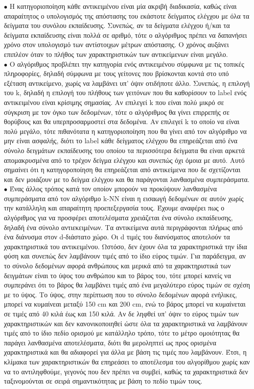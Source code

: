 \documentclass[12pt]{article}
\begin{document}
\(\bullet\) Η κατηγοριοποίηση κάθε αντικειμένου είναι μία ακριβή διαδικασία, καθώς είναι απαραίτητος ο υπολογισμός της απόστασης του εκάστοτε δείγματος ελέγχου με όλα τα δείγματα του συνόλου εκπαίδευσης. Συνεπώς, αν τα δείγματα ελέγχου ή/και τα δείγματα εκπαίδευσης είναι πολλά σε αριθμό, τότε ο αλγόριθμος πρέπει να δαπανήσει χρόνο στον υπολογισμό των αντίστοιχων μέτρων απόστασης. Ο χρόνος αυξάνει επιπλέον όταν το πλήθος των χαρακτηριστικών των αντικείμενων είναι μεγάλο. \\

\(\bullet\) Ο αλγόριθμος προβλέπει την κατηγορία ενός αντικειμένου σύμφωνα με τις τοπικές πληροφορίες, δηλαδή σύμφωνα με τους γείτονες που βρίσκονται κοντά στο υπό εξέταση αντικείμενο, χωρίς να λαμβάνει υπ' όψιν οτιδήποτε άλλο. Συνεπώς, η επιλογή του k, δηλαδή η επιλογή του πλήθους των γειτόνων που θα καθορίσουν το label ενός αντικειμένου είναι κρίσιμης σημασίας. Αν επιλεγεί k που είναι πολύ μικρό σε σύγκριση με τον όγκο των δεδομένων, τότε ο αλγόριθμος θα γίνει επιρρεπής σε θορύβους και θα υπερπροσαρμοστεί στα δεδομένα. Αν επιλεγεί k το οποίο να είναι πολύ μεγάλο, τότε πιθανότατα η κατηγοριοποίηση που θα γίνει από τον αλγόριθμο να μην είναι ασφαλής, διότι το label κάθε δείγματος ελέγχου θα επηρεάζεται από ένα σύνολο δειγμάτων εκπαίδευσης του οποίου τα περισσότερα δείγματα θα είναι αρκετά απομακρυσμένα από το τρέχον δείγμα ελέγχου και συνεπώς όχι όμοια με αυτό. Αυτό σημαίνει ότι η κατηγοροποίηση θα επηρεάζεται από αντικείμενα που δε σχετίζονται και δεν μοιάζουν με το δείγμα ελέγχου και θα παράγονται λανθασμένα συμπεράσματα. \\

\(\bullet\) Ένας άλλος τρόπος κατά τον οποίον μπορούν να προκύψουν λανθασμένα συμπεράσματα από τον αλγόριθμο k-NN είναι η εισαωγή δεδομένων σε αυτόν χωρίς την κατάλληλη και απαραίτητη προεπεξεργασία τους. Έχουμε αναφέρει πως ο αλγόριθμος για να προσφέρει αποτελέσματα χρειάζεται ένα σύνολο εκπαίδευσης, δηλαδή ένα σύνολο αντιεκειμένων. Τα  αντικείμενα αυτά περιγράφονται πλήρως από ένα διάνυσμα στον d-διάστατο χώρο. Οι d τιμές του διανύσματος αποτελούν τα χαρακτηριστικά του αντικειμένου. Ωστόσο, δεν έχουν όλα τα χαρακτηριστικά την ίδια φύση και συνεπώς δεν λαμβάνουν τιμές από το ίδιο εύρος τιμών. Για παράδειγμα, αν το σύνολο δεδομένων αφορά ανθρώπους και μερικά από τα χαρακτηριστικά των δειγμάτων είναι το ύψος του ανθρώπου και το βάρος του, τότε μπορεί κανείς να συμπεράνει ότι το βάρος θα λαμβάνει τιμές από ένα μεγαλύτερο εύρος τιμών σε σχέση με το ύψος. Το ύψος, στην περίπτωση που το σύνολο δεδομένων αφορά ενήλικες, μπορεί να κυμαίνεαι μεταξύ 150 cm και 200 cm, ενώ το βάρος μπορεί να κυμαίνεται σε τιμές από 40 κιλά έως και 150 κιλά. Αν δε ληφθεί υπ' όψιν το εύρος τιμών των χαρακτηριστικών και δεν κανονικοποιηθεί ώστε όλα τα χαρακτηριστικά να λαμβάνουν τιμές από το ίδιο πεδίο ορισμού με κατάλληλο τρόπο, τότε το μέτρο ομοιότητας θα παράγει λανθασμένα αποτελέσματα, διότι θα μεροληπτεί ως προς ορισμένα χαρακτηριστικά και θα αδιαφορεί για άλλα με βάση τις τιμές που λαμβάνουν. Έτσι, η κλίμακα των χαρακτηριστικών θα επηρεάσει το αποτέλεσμα του αλγορίθμου χωρίς καν να το αντιληφθούμε, γεγονός που δεν πρέπει να συμβεί, καθώς τα χαρακτηριστικά δεν ταξινομούνται σε σειρά σημαντικότητας με βάση το πεδίο τιμών τους. \\
\end{document}
